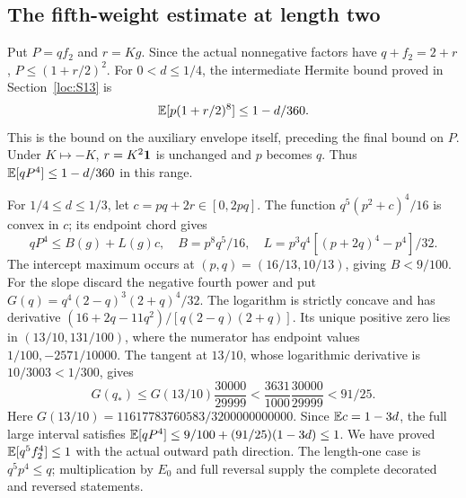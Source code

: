 \subsection{The fifth-weight estimate at length two}\label{loc:S17}
Put $P=qf_2$ and $r=Kg$. Since the actual nonnegative factors have
$q+f_2=2+r$, $P\le(1+r/2)^2$.
For $0<d\le1/4$, the intermediate Hermite bound proved in
Section~\ref{loc:S13} is
\[
 \mathbb E[p(1+r/2)^8]\le1-d/360.
\]
This is the bound on the auxiliary envelope itself, preceding the final
bound on $P$. Under $K\mapsto-K$, $r=K^2\mathbf1$ is unchanged and $p$ becomes
$q$. Thus $\mathbb E[qP^4]\le1-d/360$ in this range.

For $1/4\le d\le1/3$, let $c=pq+2r\in[0,2pq]$.
The function $q^5(p^2+c)^4/16$ is convex in $c$; its endpoint chord gives
\[
 qP^4\le B(g)+L(g)c,\quad
 B=p^8q^5/16,\quad L=p^3q^4[(p+2q)^4-p^4]/32.
\]
The intercept maximum occurs at $(p,q)=(16/13,10/13)$, giving $B<9/100$.
For the slope discard the negative fourth power and put
$G(q)=q^4(2-q)^3(2+q)^4/32$.
The logarithm is strictly concave and has derivative
$(16+2q-11q^2)/[q(2-q)(2+q)]$.
Its unique positive zero lies in $(13/10,131/100)$, where the numerator
has endpoint values $1/100,-2571/10000$.
The tangent at $13/10$, whose logarithmic derivative is $10/3003<1/300$,
gives
\[
 G(q_*)\le G(13/10)\frac{30000}{29999}
 <\frac{3631}{1000}\frac{30000}{29999}<91/25.
\]
Here $G(13/10)=11617783760583/3200000000000$.
Since $\mathbb E c=1-3d$, the full large interval satisfies
$\mathbb E[qP^4]\le9/100+(91/25)(1-3d)\le1$.
We have proved $\mathbb E[q^5f_2^4]\le1$ with the actual outward path direction.
The length-one case is $q^5p^4\le q$; multiplication by $E_0$ and full
reversal supply the complete decorated and reversed statements.
